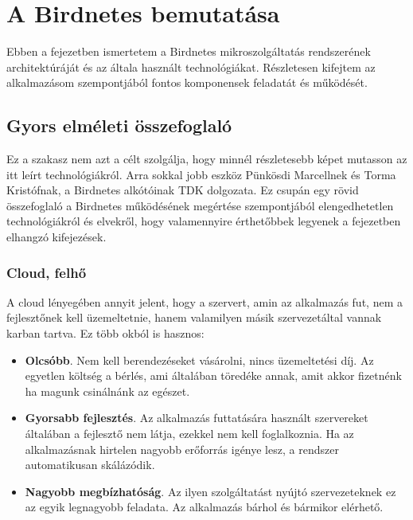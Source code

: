 \chapter{A Birdnetes bemutatása}
\label{chapt:birdnetes-introduction}
Ebben a fejezetben ismertetem a Birdnetes mikroszolgáltatás rendszerének architektúráját és az általa használt technológiákat.
Részletesen kifejtem az alkalmazásom szempontjából fontos komponensek feladatát és működését.

\section{Gyors elméleti összefoglaló}
Ez a szakasz nem azt a célt szolgálja, hogy minnél részletesebb képet mutasson az itt leírt technológiákról.
Arra sokkal jobb eszköz Pünkösdi Marcellnek és Torma Kristófnak, a Birdnetes alkótóinak TDK dolgozata\cite{birdnetes-tdk}.
Ez csupán egy rövid összefoglaló a Birdnetes működésének megértése szempontjából elengedhetetlen technológiákról és elvekről,
hogy valamennyire érthetőbbek legyenek a fejezetben elhangzó kifejezések.

\subsection{Cloud, felhő}
A cloud lényegében annyit jelent, hogy a szervert, amin az alkalmazás fut, nem a fejlesztőnek kell üzemeltetnie,
hanem valamilyen másik szervezet\footnotemark által vannak karban tartva. 
Ez több okból is hasznos:
\begin{itemize}
    \item \textbf{Olcsóbb}. Nem kell berendezéseket vásárolni, nincs üzemeltetési díj. Az egyetlen költség a bérlés, ami általában töredéke annak, amit akkor fizetnénk ha magunk csinálnánk az egészet.
    \item \textbf{Gyorsabb fejlesztés}. Az alkalmazás futtatására használt szervereket általában a fejlesztő nem látja, ezekkel nem kell foglalkoznia. Ha az alkalmazásnak hirtelen nagyobb erőforrás igénye lesz, a rendszer automatikusan skálázódik.
    \item \textbf{Nagyobb megbízhatóság}. Az ilyen szolgáltatást nyújtó szervezeteknek ez az egyik legnagyobb feladata. Az alkalmazás bárhol és bármikor elérhető.
\end{itemize}

